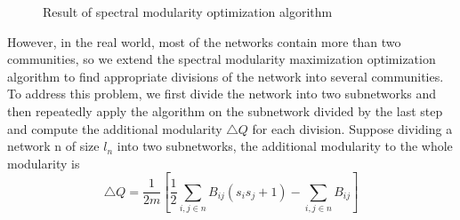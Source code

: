 \documentclass[12pt,oneside,final]{vlsithesis}
\begin{document}
\begin{figure*}
	\centering
	\caption{Result of spectral modularity optimization algorithm}
	\label{fig:result of spectral}
\end{figure*}

However, in the real world, most of the networks contain more than two communities, so we extend the spectral modularity maximization optimization algorithm to find appropriate divisions of the network into several communities. To address this problem, we first divide the network into two subnetworks and then repeatedly apply the algorithm on the subnetwork divided by the last step and compute the additional modularity $\bigtriangleup Q$ for each division. Suppose dividing a network n of size $l_{n}$ into two subnetworks, the additional modularity to the whole modularity is
\begin{equation}
	\bigtriangleup Q = \frac{1}{2m}[\frac{1}{2}\sum_{i,j \in n}B_{ij}(s_{i}s_{j} + 1) - \sum_{i,j \in n}B_{ij} ]
\end{equation}
\end{document}
